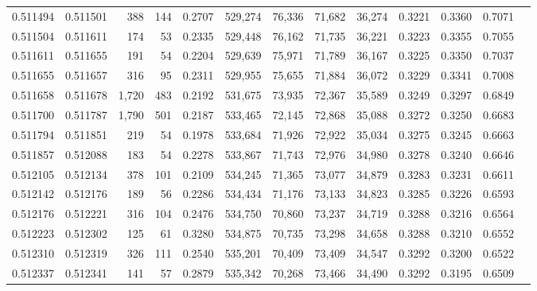 \begin{tabular}{rrrrrrrrrrrrr}
0.511494 & 0.511501 &   388 &   144 &                                     0.2707 & 529,274 &  76,336 &  71,682 &  36,274 & 0.3221 & 0.3360 & 0.7071 \\
0.511504 & 0.511611 &   174 &    53 &                                     0.2335 & 529,448 &  76,162 &  71,735 &  36,221 & 0.3223 & 0.3355 & 0.7055 \\
0.511611 & 0.511655 &   191 &    54 &                                     0.2204 & 529,639 &  75,971 &  71,789 &  36,167 & 0.3225 & 0.3350 & 0.7037 \\
0.511655 & 0.511657 &   316 &    95 &                                     0.2311 & 529,955 &  75,655 &  71,884 &  36,072 & 0.3229 & 0.3341 & 0.7008 \\
0.511658 & 0.511678 & 1,720 &   483 &                                     0.2192 & 531,675 &  73,935 &  72,367 &  35,589 & 0.3249 & 0.3297 & 0.6849 \\
0.511700 & 0.511787 & 1,790 &   501 &                                     0.2187 & 533,465 &  72,145 &  72,868 &  35,088 & 0.3272 & 0.3250 & 0.6683 \\
0.511794 & 0.511851 &   219 &    54 &                                     0.1978 & 533,684 &  71,926 &  72,922 &  35,034 & 0.3275 & 0.3245 & 0.6663 \\
0.511857 & 0.512088 &   183 &    54 &                                     0.2278 & 533,867 &  71,743 &  72,976 &  34,980 & 0.3278 & 0.3240 & 0.6646 \\
0.512105 & 0.512134 &   378 &   101 &                                     0.2109 & 534,245 &  71,365 &  73,077 &  34,879 & 0.3283 & 0.3231 & 0.6611 \\
0.512142 & 0.512176 &   189 &    56 &                                     0.2286 & 534,434 &  71,176 &  73,133 &  34,823 & 0.3285 & 0.3226 & 0.6593 \\
0.512176 & 0.512221 &   316 &   104 &                                     0.2476 & 534,750 &  70,860 &  73,237 &  34,719 & 0.3288 & 0.3216 & 0.6564 \\
0.512223 & 0.512302 &   125 &    61 &                                     0.3280 & 534,875 &  70,735 &  73,298 &  34,658 & 0.3288 & 0.3210 & 0.6552 \\
0.512310 & 0.512319 &   326 &   111 &                                     0.2540 & 535,201 &  70,409 &  73,409 &  34,547 & 0.3292 & 0.3200 & 0.6522 \\
0.512337 & 0.512341 &   141 &    57 &                                     0.2879 & 535,342 &  70,268 &  73,466 &  34,490 & 0.3292 & 0.3195 & 0.6509 \\

\end{tabular}
